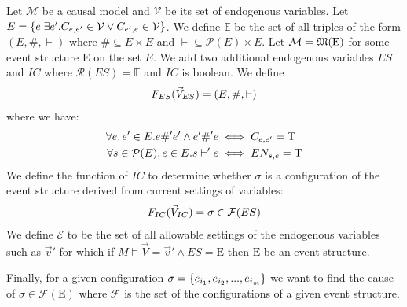 Let $\mathcal{M}$ be a causal model and $\mathcal{V}$ be its set of
endogenous variables.
Let $E = \{e|\exists e'. C_{e,e'} \in \mathcal{V} \vee C_{e',e} \in \mathcal{V} \}$.
We define $\mathbb{E}$ be the set of all
triples of the form $(E,\#,\vdash)$ where $\# \subseteq E \times E$
and $\vdash \subseteq \mathcal{P}(E) \times E$.
Let $\mathcal{M} = \mathfrak{M}(\mathrm{E})$ for some event structure
$\mathrm{E}$ on the set $E$.
We add two additional endogenous variables $ES$ and $IC$
where $\mathcal{R}(ES) = \mathbb{E}$ and $IC$ is boolean.
We define
\begin{align*}
    F_{ES}(\vec V_{ES}) = (E,\#,\vdash)
\end{align*}
where we have:
\begin{align*}
    \forall e,e' \in E. e \#' e' \wedge e' \#' e
     & \iff C_{e,e'} = \mathrm{T} \\
    \forall s \in \mathcal{P}(E), e \in E.  s \vdash' e
     & \iff EN_{s,e} = \mathrm{T}
\end{align*}
We define the function of $IC$ to determine whether $\sigma$
is a configuration of the event structure derived from current
settings of variables:
\begin{align*}
    F_{IC}(\vec V_{IC}) = \sigma \in \mathcal{F}(ES)
\end{align*}
We define $\mathcal{E}$ to be the set of all allowable
settings of the endogenous variables such as $\vec v'$
for which if $M \vDash \vec V = \vec v' \wedge ES = \mathrm{E}$ then $\mathrm{E}$ be an event structure.

Finally, for a given configuration $\sigma = \{e_{i_1},e_{i_2},...,e_{i_m}\}$
we want to find the cause of
$\sigma \in \mathcal{F}(\mathrm{E})$ where $\mathcal{F}$
is the set of the configurations of a given event structure.

